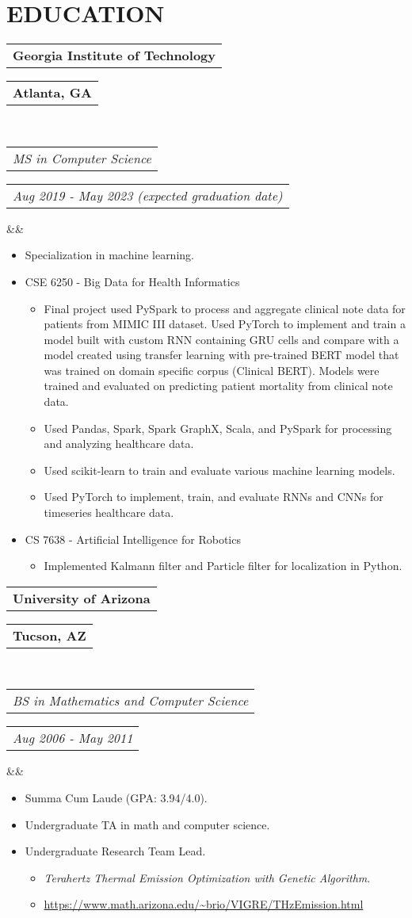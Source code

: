 \documentclass[11pt,a4paper,roman]{moderncv}
\makeatletter
\newcommand*{\customcventry}[7][.25em]{
  \begin{tabular}{@{}l} 
    {\bfseries #4}
  \end{tabular}
  \hfill %
  \begin{tabular}{l@{}}
     {\bfseries #5}
  \end{tabular} \\
  \begin{tabular}{@{}l} 
    {\itshape #3}
  \end{tabular}
  \hfill %
  \begin{tabular}{l@{}}
     {\itshape #2}
  \end{tabular}
  \ifx&#7&%
  \else{\\%
    \begin{minipage}{\maincolumnwidth}%
      \small#7%
    \end{minipage}}\fi%
  \par\addvspace{#1}}
\makeatother
\begin{document}
{{\section{EDUCATION}
{\customcventry{Aug 2019 - May 2023 (expected graduation date)}{MS in Computer Science}{Georgia Institute of Technology}{Atlanta, GA}
{}{}
{
\begin{itemize}
  \item Specialization in machine learning.
  \item CSE 6250 - Big Data for Health Informatics
  \begin{itemize}
  	\item Final project used PySpark to process and aggregate clinical note data for patients from MIMIC III dataset. Used PyTorch to implement and train a model built with custom RNN containing GRU cells and compare with a model created using transfer learning with pre-trained BERT model that was trained on domain specific corpus (Clinical BERT). Models were trained and evaluated on predicting patient mortality from clinical note data.
  	\item Used Pandas, Spark, Spark GraphX, Scala, and PySpark for processing and analyzing healthcare data.
  	\item Used scikit-learn to train and evaluate various machine learning models.
  	\item Used PyTorch to implement, train, and evaluate RNNs and CNNs for timeseries healthcare data.
  \end{itemize}
  \item CS 7638 - Artificial Intelligence for Robotics
  \begin{itemize}
  	\item Implemented Kalmann filter and Particle filter for localization in Python.
  \end{itemize}
 \end{itemize}
}

\vspace{12pt}

{\customcventry{Aug 2006 - May 2011}{BS in Mathematics and Computer Science}{University of Arizona}{Tucson, AZ}{}{}
{\begin{itemize}
  \item Summa Cum Laude (GPA: 3.94/4.0).
  \item Undergraduate TA in math and computer science.
  \item Undergraduate Research Team Lead.
  \begin{itemize}
    \item \textit{Terahertz Thermal Emission Optimization with Genetic Algorithm}.
    \item \url{https://www.math.arizona.edu/~brio/VIGRE/THzEmission.html}
  \end{itemize}
\end{itemize}
}

}}}}
\end{document}

